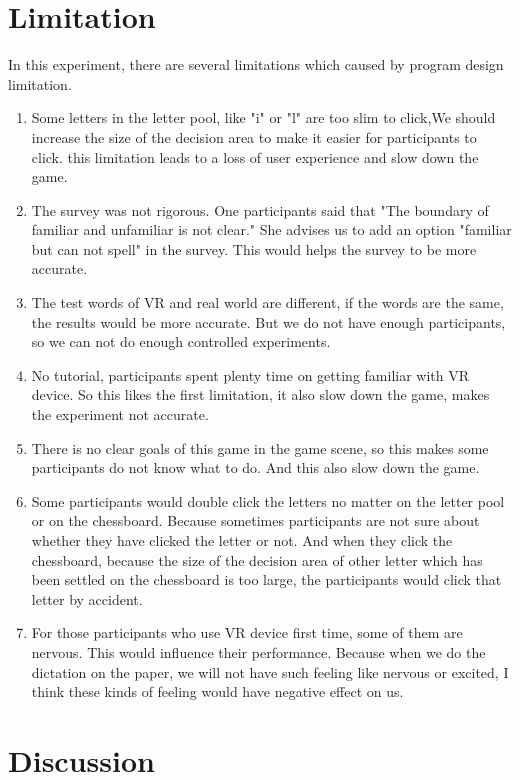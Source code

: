 \documentclass{vgtc}                          %
\begin{document}
\section{Limitation}
In this experiment, there are several limitations which caused by program design limitation. 
\begin{enumerate}
    \item Some letters in the letter pool, like "i" or "l" are too slim to click,We should increase the size of the decision area to make it easier for participants to click. this limitation leads to a loss of user experience and slow down the game.
    \item The survey was not rigorous. One participants said that "The boundary of familiar and unfamiliar is not clear." She advises us to add an option "familiar but can not spell" in the survey. This would helps the survey to be more accurate.
    \item The test words of VR and real world are different, if the words are the same, the results would be more accurate. But we do not have enough participants, so we can not do enough controlled experiments.
    \item No tutorial, participants spent plenty time on getting familiar with VR device. So this likes the first limitation, it also slow down the game, makes the experiment not accurate.
    \item There is no clear goals of this game in the game scene, so this makes some participants do not know what to do. And this also slow down the game.
    \item Some participants would double click the letters no matter on the letter pool or on the chessboard. Because sometimes participants are not sure about whether they have clicked the letter or not. And when they click the chessboard, because the size of the decision area of other letter which has been settled on the chessboard is too large, the participants would click that letter by accident. 
    \item For those participants who use VR device first time, some of them are nervous. This would influence their performance. Because when we do the dictation on the paper, we will not have such feeling like nervous or excited, I think these kinds of feeling would have negative effect on us.
\end{enumerate}
\section{Discussion}
\end{document}
